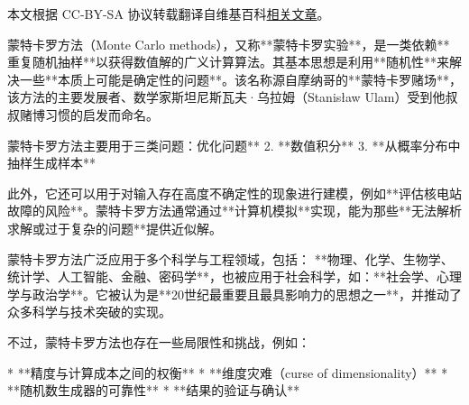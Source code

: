 
本文根据 CC-BY-SA 协议转载翻译自维基百科\href{https://en.wikipedia.org/wiki/Monte_Carlo_method}{相关文章}。

蒙特卡罗方法（Monte Carlo methods），又称**蒙特卡罗实验**，是一类依赖**重复随机抽样**以获得数值解的广义计算算法。其基本思想是利用**随机性**来解决一些**本质上可能是确定性的问题**。该名称源自摩纳哥的**蒙特卡罗赌场**，该方法的主要发展者、数学家斯坦尼斯瓦夫·乌拉姆（Stanisław Ulam）受到他叔叔赌博习惯的启发而命名。

蒙特卡罗方法主要用于三类问题：优化问题**
2. **数值积分**
3. **从概率分布中抽样生成样本**

此外，它还可以用于对输入存在高度不确定性的现象进行建模，例如**评估核电站故障的风险**。蒙特卡罗方法通常通过**计算机模拟**实现，能为那些**无法解析求解或过于复杂的问题**提供近似解。

蒙特卡罗方法广泛应用于多个科学与工程领域，包括：
**物理、化学、生物学、统计学、人工智能、金融、密码学**，也被应用于社会科学，如：**社会学、心理学与政治学**。它被认为是**20世纪最重要且最具影响力的思想之一**，并推动了众多科学与技术突破的实现。

不过，蒙特卡罗方法也存在一些局限性和挑战，例如：

* **精度与计算成本之间的权衡**
* **维度灾难（curse of dimensionality）**
* **随机数生成器的可靠性**
* **结果的验证与确认**
